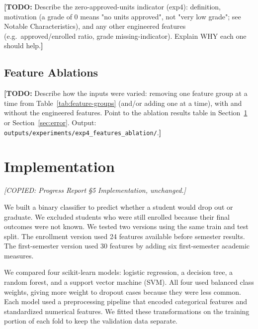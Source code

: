 \documentclass[11pt]{article}
\newcommand{\todo}[1]{{\color{red}\textbf{[TODO:} #1\textbf{]}}}
\newcommand{\copynote}[1]{{\color{blue}\textit{[COPIED: #1]}}}
\newcommand{\todo}[1]{}
\newcommand{\copynote}[1]{}
\begin{document}
\todo{Describe the zero-approved-units indicator (exp4): definition, motivation (a grade of 0 means "no units approved", not "very low grade"; see Notable Characteristics), and any other engineered features (e.g.\ approved/enrolled ratio, grade missing-indicator). Explain WHY each one should help.}

\subsection{Feature Ablations}

\todo{Describe how the inputs were varied: removing one feature group at a time from Table~\ref{tab:feature-groups} (and/or adding one at a time), with and without the engineered features. Point to the ablation results table in Section~\ref{sec:implementation} or Section~\ref{sec:error}. Output: \texttt{outputs/experiments/exp4\_features\_ablation/}.}

\section{Implementation}\label{sec:implementation}
\copynote{Progress Report \S5 Implementation, unchanged.}

We built a binary classifier to predict whether a student would drop out or graduate. We excluded students who were still enrolled because their final outcomes were not known. We tested two versions using the same train and test split. The enrollment version used 24 features available before semester results. The first-semester version used 30 features by adding six first-semester academic measures.

We compared four scikit-learn models: logistic regression, a decision tree, a random forest, and a support vector machine (SVM). All four used balanced class weights, giving more weight to dropout cases because they were less common. Each model used a preprocessing pipeline that encoded categorical features and standardized numerical features. We fitted these transformations on the training portion of each fold to keep the validation data separate.
\end{document}
